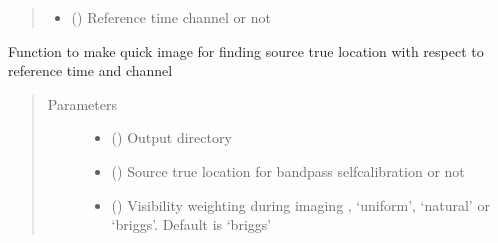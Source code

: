 \documentclass[letterpaper,10pt,english]{sphinxmanual}
\begin{document}
\begin{fulllineitems}
\begin{fulllineitems}
\begin{quote}
\begin{description}
\begin{itemize}
\item {} 
\sphinxAtStartPar
{} () \textendash{} Reference time channel or not

\end{itemize}

\end{description}\end{quote}

\end{fulllineitems}


\begin{fulllineitems}
\label{\detokenize{paircars:paircars.intensity_selfcal_LTS.IntensitySelfcal.image_source_true_loc}}
\sphinxAtStartPar
Function to make quick image for finding source true location with respect to reference time and channel
\begin{quote}\begin{description}
\item[{Parameters}] \leavevmode\begin{itemize}
\item {} 
\sphinxAtStartPar
{} () \textendash{} Output directory

\item {} 
\sphinxAtStartPar
{} () \textendash{} Source true location for bandpass self\sphinxhyphen{}calibration or not

\item {} 
\sphinxAtStartPar
{} () \textendash{} Visibility weighting during imaging , ‘uniform’, ‘natural’ or ‘briggs’. Default is ‘briggs’


\end{itemize}
\end{description}
\end{quote}
\end{fulllineitems}
\end{fulllineitems}
\end{document}
